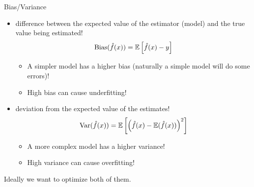 \documentclass[xcolor={usenames,dvipsnames},handout]{beamer}
\begin{document}
\begin{frame}{Bias/Variance}
\begin{itemize}
\item {} difference between the expected value of the estimator (model) and the true value being estimated!
$$
\text{Bias}(\hat{f}(x)) = \mathbb{E}\left[ \hat{f}(x) - y \right]
$$
\begin{itemize}
\item A simpler model has a higher bias (naturally a simple model will
do some errors)!
\item High bias can cause \alert{underfitting!}
\end{itemize}
\pause
\item {} deviation from the expected value of the estimates!
$$
\text{Var}(\hat{f}(x)) = \mathbb{E}\left[ \left(\hat{f}(x) - \mathbb{E} (\hat{f}(x))\right)^2 \right]
$$
\begin{itemize}
\item A more complex model has a higher variance! 
\item High variance can cause \alert{overfitting!}
\end{itemize}
\end{itemize}
\pause
\begin{exampleblock}{}
Ideally we want to optimize both of them.
\end{exampleblock}
\end{frame}

%
\end{document}
